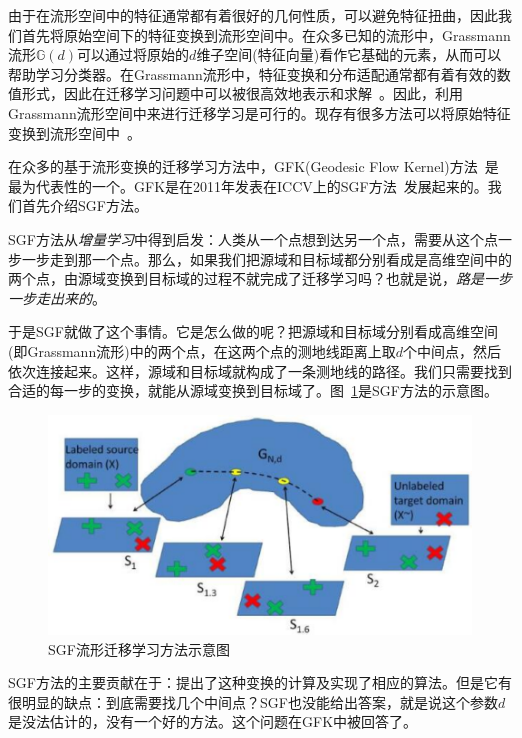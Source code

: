 由于在流形空间中的特征通常都有着很好的几何性质，可以避免特征扭曲，因此我们首先将原始空间下的特征变换到流形空间中。在众多已知的流形中，Grassmann流形$\mathbb{G}(d)$可以通过将原始的$d$维子空间(特征向量)看作它基础的元素，从而可以帮助学习分类器。在Grassmann流形中，特征变换和分布适配通常都有着有效的数值形式，因此在迁移学习问题中可以被很高效地表示和求解~\cite{hamm2008grassmann}。因此，利用Grassmann流形空间中来进行迁移学习是可行的。现存有很多方法可以将原始特征变换到流形空间中~\cite{gopalan2011domain,baktashmotlagh2014domain}。

在众多的基于流形变换的迁移学习方法中，GFK(Geodesic Flow Kernel)方法~\cite{gong2012geodesic}是最为代表性的一个。GFK是在2011年发表在ICCV上的SGF方法~\cite{gopalan2011domain}发展起来的。我们首先介绍SGF方法。

SGF方法从\textit{增量学习}中得到启发：人类从一个点想到达另一个点，需要从这个点一步一步走到那一个点。那么，如果我们把源域和目标域都分别看成是高维空间中的两个点，由源域变换到目标域的过程不就完成了迁移学习吗？也就是说，\textit{路是一步一步走出来的}。

于是SGF就做了这个事情。它是怎么做的呢？把源域和目标域分别看成高维空间(即Grassmann流形)中的两个点，在这两个点的测地线距离上取$d$个中间点，然后依次连接起来。这样，源域和目标域就构成了一条测地线的路径。我们只需要找到合适的每一步的变换，就能从源域变换到目标域了。图~\ref{fig-subspace-sgf}是SGF方法的示意图。

\begin{figure}[htbp]
	\centering
	\includegraphics[scale=0.5]{./figures/fig-subspace-sgf.pdf}
	\caption{SGF流形迁移学习方法示意图}
	\label{fig-subspace-sgf}
\end{figure}

SGF方法的主要贡献在于：提出了这种变换的计算及实现了相应的算法。但是它有很明显的缺点：到底需要找几个中间点？SGF也没能给出答案，就是说这个参数$d$是没法估计的，没有一个好的方法。这个问题在GFK中被回答了。

